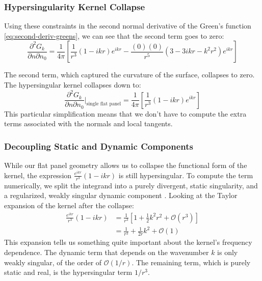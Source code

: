 \subsubsection{Hypersingularity Kernel Collapse} \label{subsubsec:hypersingularity-collapse}
Using these constraints in the second normal derivative of the Green's function \eqref{eq:second-deriv-greens}, we can see that the second term goes to zero:
\begin{equation}
    \frac{\partial^2 G_k}{\partial n \partial n_0} =  \frac{1}{4\pi} \left[\frac{1}{r^3}(1 - ikr)e^{ikr} - \frac{(0) (0)}{r^5} (3 - 3 i k r - k^2 r^2) e^{ikr} \right]
\end{equation}

The second term, which captured the curvature of the surface, collapses to zero. The hypersingular kernel collapses down to:
\begin{equation}
    \frac{\partial^2 G_k}{\partial n \partial n_0} \bigg|_{\text{single flat panel}} =  \frac{1}{4\pi} \left[\frac{1}{r^3}(1 - ikr)e^{ikr} \right]
\end{equation}
This particular simplification means that we don't have to compute the extra terms associated with the normals and local tangents.

\subsubsection{Decoupling Static and Dynamic Components} \label{subsubsec:decoupling-static-dynamic-components}
While our flat panel geometry allows us to collapse the functional form of the kernel, the expression $ \frac{e^{ikr}}{r^3}(1 - ikr)$ is still hypersingular. To compute the term numerically, we split the integrand into a purely divergent, static singularity, and a regularized, weakly singular dynamic component \cite{sunnonsingularburtonmiller2023}.
Looking at the Taylor expansion of the kernel after the collapse:
\begin{align}
    \frac{e^{ikr}}{r^3}(1 - ikr) &= \frac{1}{r^3} \left[ 1 + \frac{1}{2} k^2 r^2 + \mathcal{O}(r^3) \right] \\
    &= \frac{1}{r^3} + \frac{1}{2 r} k^2 + \mathcal{O}(1)
\end{align}
This expansion tells us something quite important about the kernel's frequency dependence. The dynamic term that depends on the wavenumber $k$ is only weakly singular, of the order of $\mathcal{O}(1/r)$. The remaining term, which is purely static and real, is the hypersingular term $1/r^3$.

